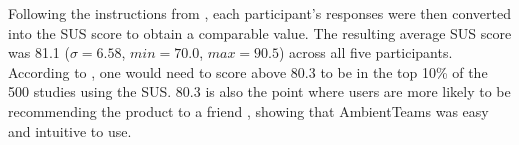 Following the instructions from \textcite{sauroSUS}, each participant's responses were then converted into the SUS score to obtain a comparable value. The resulting average SUS score was 81.1 ($\sigma=6.58$, $min=70.0$, $max=90.5$) across all five participants. According to \textcite{sauroSUS}, one would need to score above 80.3 to be in the top 10\% of the 500 studies using the SUS. 80.3 is also the point where users are more likely to be recommending the product to a friend \autocite{sauroSUS}, showing that AmbientTeams was easy and intuitive to use.



